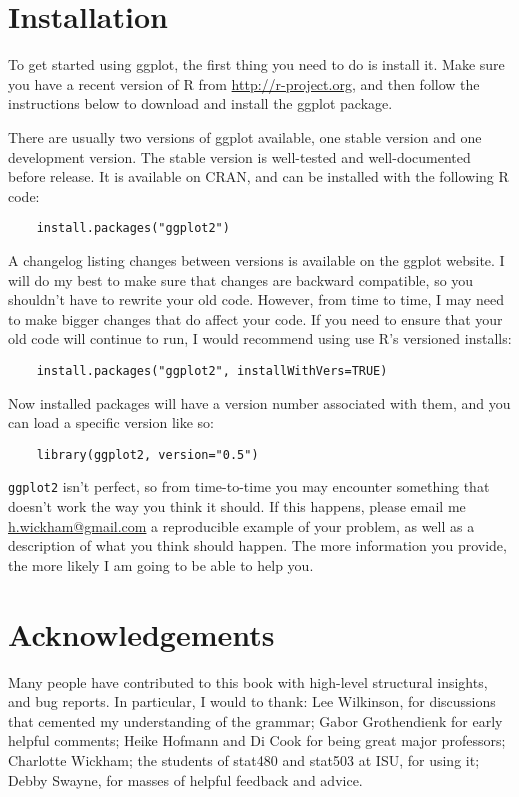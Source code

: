 \section{Installation}\label{sub:installation}

To get started using ggplot, the first thing you need to do is install it.  Make sure you have a recent version of R from \url{http://r-project.org}, and then follow the instructions below to download and install the ggplot package.  

There are usually two versions of ggplot available, one stable version and one development version. The stable version is well-tested and well-documented before release.  It is available on CRAN, and can be installed with the following R code:

\begin{verbatim}
	install.packages("ggplot2")
\end{verbatim}

A changelog listing changes between versions is available on the ggplot website.  I will do my best to make sure that changes are backward compatible, so you shouldn't have to rewrite your old code.  However, from time to time, I may need to make bigger changes that do affect your code.  If you need to ensure that your old code will continue to run, I would recommend using use R's versioned installs:

\begin{verbatim}
	install.packages("ggplot2", installWithVers=TRUE)
\end{verbatim}

Now installed packages will have a version number associated with them, and you can load a specific version like so:

\begin{verbatim}
	library(ggplot2, version="0.5")
\end{verbatim}

{\tt ggplot2} isn't perfect, so from time-to-time you may encounter something that doesn't work the way you think it should.  If this happens, please email me \href{mailto:h.wickham@gmail.com}{h.wickham@gmail.com} a reproducible example of your problem, as well as a description of what you think should happen.  The more information you provide, the more likely I am going to be able to help you.

\section{Acknowledgements}\label{sec:acknolwedgements}

Many people have contributed to this book with high-level structural insights, and bug reports.  In particular, I would to thank: Lee Wilkinson, for discussions that cemented my understanding of the grammar; Gabor Grothendienk for early helpful comments; Heike Hofmann and Di Cook for being great major professors; Charlotte Wickham; the students of stat480 and stat503 at ISU, for using it; Debby Swayne, for masses of helpful feedback and advice.


